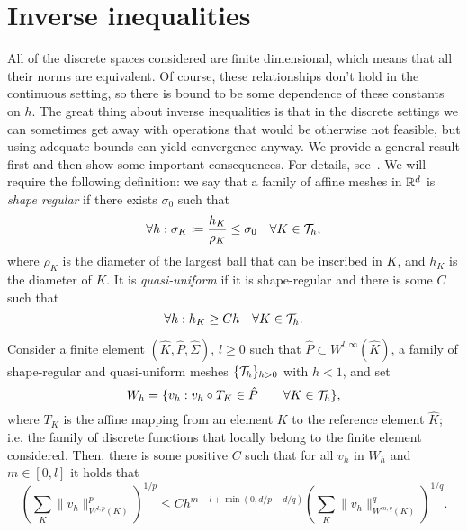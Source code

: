\section{Inverse inequalities}
All of the discrete spaces considered are finite dimensional, which means that all their norms are equivalent. Of course, these relationships don't hold in the continuous setting, so there is bound to be some dependence of these constants on $h$. The great thing about inverse inequalities is that in the discrete settings we can sometimes get away with operations that would be otherwise not feasible, but using adequate bounds can yield convergence anyway. We provide a general result first and then show some important consequences. For details, see~\cite{ern2004theory}. We will require the following definition: we say that a family of affine meshes in $\mathbb{R}^d$ is \emph{shape regular} if there exists $\sigma_0$ such that 
\begin{equation}
    \forall h: \sigma_K\coloneqq \frac{h_K}{\rho_K} \leq \sigma_0 \quad\forall K\in \mathcal{T}_h,
\end{equation}
where $\rho_K$ is the diameter of the largest ball that can be inscribed in $K$, and $h_K$ is the diameter of $K$. It is \emph{quasi-uniform} if it is shape-regular and there is some $C$ such that
\begin{equation}\label{eq:def-quasi-uniform}
    \forall h: h_K \geq C h \quad \forall K\in \mathcal{T}_h.
\end{equation}
\begin{theorem}\label{thm:global-inverse-inequality}
    Consider a finite element $(\hat K, \hat P, \hat \Sigma)$, $l\geq 0$ such that $\hat P\subset W^{l,\infty}(\hat K)$, a family of shape-regular and quasi-uniform meshes $\{\mathcal{T}_h\}_{h>0}$ with $h<1$, and set
    \begin{equation}
        W_h = \{v_h: v_h\circ T_K \in \hat P \qquad\forall K\in \mathcal{T}_h \},
    \end{equation}
    where $T_K$ is the affine mapping from an element $K$ to the reference element $\hat K$; i.e. the family of discrete functions that locally belong to the finite element considered. Then, there is some positive $C$ such that for all $v_h$ in $W_h$ and $m\in [0,l]$ it holds that
    \begin{equation}
        \left(\sum_K \| v_h\|^p_{W^{l,p}(K)}\right)^{1/p} \leq Ch^{m-l+\min(0, d/p - d/q)} \left(\sum_K \|v_h\|_{W^{m,q}(K)}^q\right)^{1/q}.
    \end{equation}
\end{theorem}

